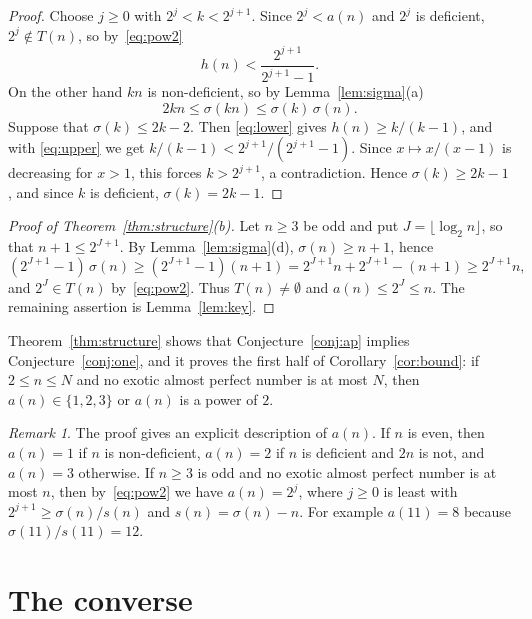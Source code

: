 \documentclass[12pt,reqno]{article}
\theoremstyle{plain}
\theoremstyle{definition}
\theoremstyle{remark}
\newtheorem{remark}[theorem]{Remark}
\begin{document}
\begin{proof}
Choose $j \ge 0$ with $2^j < k < 2^{j+1}$. Since $2^j < a(n)$ and $2^j$ is
deficient, $2^j \notin T(n)$, so by~\eqref{eq:pow2}
\begin{equation}\label{eq:upper}
  h(n) < \frac{2^{j+1}}{2^{j+1}-1}.
\end{equation}
On the other hand $kn$ is non-deficient, so by Lemma~\ref{lem:sigma}(a)
\begin{equation}\label{eq:lower}
  2kn \le \sigma(kn) \le \sigma(k)\,\sigma(n).
\end{equation}
Suppose that $\sigma(k) \le 2k-2$. Then \eqref{eq:lower} gives
$h(n) \ge k/(k-1)$, and with \eqref{eq:upper} we get
$k/(k-1) < 2^{j+1}/(2^{j+1}-1)$. Since $x \mapsto x/(x-1)$ is decreasing for
$x > 1$, this forces $k > 2^{j+1}$, a contradiction. Hence $\sigma(k) \ge 2k-1$,
and since $k$ is deficient, $\sigma(k) = 2k-1$.
\end{proof}

\begin{proof}[Proof of Theorem~\ref{thm:structure}(b)]
Let $n \ge 3$ be odd and put $J = \lfloor \log_2 n \rfloor$, so that
$n + 1 \le 2^{J+1}$. By Lemma~\ref{lem:sigma}(d), $\sigma(n) \ge n+1$, hence
\[
 (2^{J+1}-1)\,\sigma(n) \ge (2^{J+1}-1)(n+1) = 2^{J+1}n + 2^{J+1} - (n+1) \ge 2^{J+1} n ,
\]
and $2^J \in T(n)$ by~\eqref{eq:pow2}. Thus $T(n) \neq \emptyset$ and
$a(n) \le 2^J \le n$. The remaining assertion is Lemma~\ref{lem:key}.
\end{proof}

Theorem~\ref{thm:structure} shows that Conjecture~\ref{conj:ap} implies
Conjecture~\ref{conj:one}, and it proves the first half of
Corollary~\ref{cor:bound}: if $2 \le n \le N$ and no exotic almost perfect number
is at most $N$, then $a(n) \in \{1,2,3\}$ or $a(n)$ is a power of $2$.

\begin{remark}\label{rem:formula}
The proof gives an explicit description of $a(n)$. If $n$ is even, then
$a(n) = 1$ if $n$ is non-deficient, $a(n) = 2$ if $n$ is deficient and $2n$ is
not, and $a(n) = 3$ otherwise. If $n \ge 3$ is odd and no exotic almost perfect
number is at most $n$, then by~\eqref{eq:pow2} we have $a(n) = 2^j$, where
$j \ge 0$ is least with $2^{j+1} \ge \sigma(n)/s(n)$ and
$s(n) = \sigma(n) - n$. For example $a(11) = 8$ because
$\sigma(11)/s(11) = 12$.
\end{remark}

\section{The converse}
\end{document}
